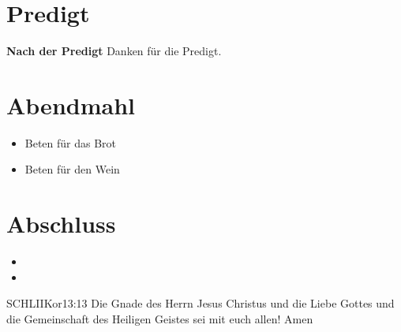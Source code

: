 \documentclass[fontsize=14pt]{mybib}
\begin{document}
\section{Predigt}
\textbf{Nach der Predigt}\newline
Danken für die Predigt.
\section{Abendmahl}
\begin{itemize}
    \item [] Beten für das Brot
    \item [] Beten für den Wein
\end{itemize}
\section{Abschluss}
\begin{itemize}
    \item [] 
    \item [] \beten{}
\end{itemize}
\begin{bibelbox}{SCHL}{IIKor}{13:13}
    Die Gnade des Herrn Jesus Christus und die Liebe Gottes und die Gemeinschaft des Heiligen Geistes sei mit euch allen! Amen
\end{bibelbox}
\end{document}
